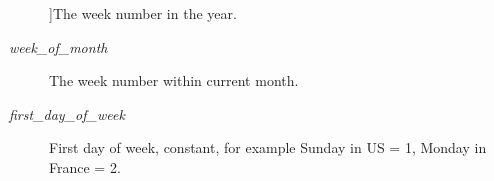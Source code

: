 \begin{Desc}
\begin{description}
{}]The week number in the year. \item[{\em 
week\-\_\-of\-\_\-month\label{namespacebooster_1_1locale_1_1period_1_1marks_a088e16937a13070e5545d25feaca4a65a57459eb7e4b32875b591de007c6dc550}
}]The week number within current month. \item[{\em 
first\-\_\-day\-\_\-of\-\_\-week\label{namespacebooster_1_1locale_1_1period_1_1marks_a088e16937a13070e5545d25feaca4a65a92ce727c44be13f02f9f9f21637ef939}
}]First day of week, constant, for example Sunday in U\-S = 1, Monday in France = 2. \end{description}
\end{Desc}
